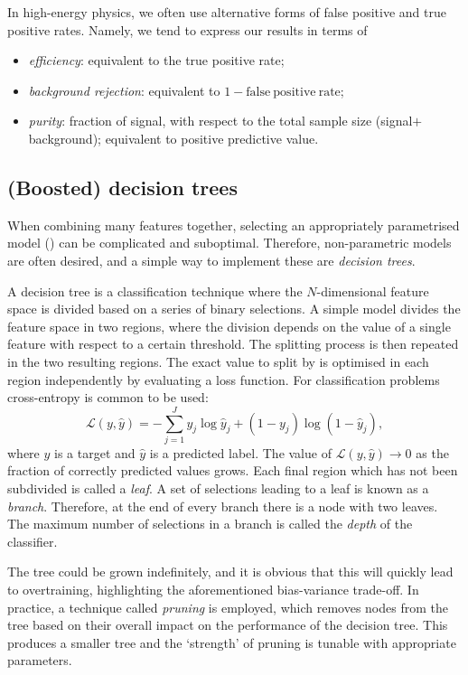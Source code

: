 In high-energy physics, we often use alternative forms of false positive and true positive rates.
Namely, we tend to express our results in terms of 
\begin{itemize}
    \item \textit{efficiency}: equivalent to the true positive rate;
    \item \textit{background rejection}: equivalent to $1 - \mathrm{false~positive~rate}$;
    \item \textit{purity}: fraction of signal, with respect to the total sample size (signal$+$background); equivalent to positive predictive value.
\end{itemize}

\subsection{(Boosted) decision trees}\label{sec:BDTs_theory}

When combining many features together, selecting an appropriately parametrised model () can be complicated and suboptimal.
Therefore, non-parametric models are often desired, and a simple way to implement these are \textit{decision trees}.

A decision tree is a classification technique where the $N$-dimensional feature space is divided based on a series of binary selections.
A simple model divides the feature space in two regions, where the division depends on the value of a single feature with respect to a certain threshold. 
The splitting process is then repeated in the two resulting regions.
The exact value to split by is optimised in each region independently by evaluating a loss function.
For classification problems cross-entropy is common to be used:
\begin{equation}
    \mathcal{L}(y,\hat{y})=-\sum_{j=1}^J y_j\log \hat{y}_j + (1-y_j)\log(1-\hat{y}_j),
\end{equation}
where $y$ is a target and $\hat{y}$ is a predicted label. 
The value of $\mathcal{L}(y,\hat{y})\to0$ as the fraction of correctly predicted values grows.
Each final region which has not been subdivided is called a \textit{leaf}.
A set of selections leading to a leaf is known as a \textit{branch}. 
Therefore, at the end of every branch there is a node with two leaves.
The maximum number of selections in a branch is called the \textit{depth} of the classifier.

The tree could be grown indefinitely, and it is obvious that this will quickly lead to overtraining, highlighting the aforementioned bias-variance trade-off.
In practice, a technique called \textit{pruning} is employed, which removes nodes from the tree based on their overall impact on the performance of the decision tree.
This produces a smaller tree and the `strength' of pruning is tunable with appropriate parameters.

